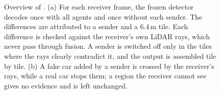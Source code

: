 \begin{figure}[!t]
\caption{Overview of \mint. (a) For each receiver frame, the frozen detector decodes once with all agents and
once without each sender. The differences are attributed to a sender and a 6.4\,m tile. Each difference is
checked against the receiver's own LiDAR rays, which never pass through fusion. A sender is switched off only in
the tiles where the rays clearly contradict it, and the output is assembled tile by tile. (b) A fake car added by
a sender is crossed by the receiver's rays, while a real car stops them; a region the receiver cannot see gives
no evidence and is left unchanged.}
\label{fig:mintmethod}
\end{figure}
